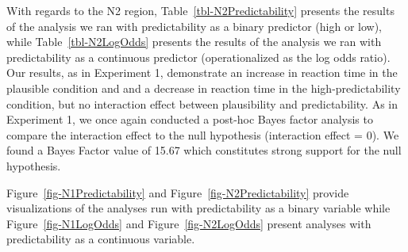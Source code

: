 \documentclass[
  12pt,
  letterpaper,
]{scrreprt}
\begin{document}
With regards to the N2 region, Table~\ref{tbl-N2Predictability} presents
the results of the analysis we ran with predictability as a binary
predictor (high or low), while Table~\ref{tbl-N2LogOdds} presents the
results of the analysis we ran with predictability as a continuous
predictor (operationalized as the log odds ratio). Our results, as in
Experiment 1, demonstrate an increase in reaction time in the plausible
condition and and a decrease in reaction time in the high-predictability
condition, but no interaction effect between plausibility and
predictability. As in Experiment 1, we once again conducted a post-hoc
Bayes factor analysis to compare the interaction effect to the null
hypothesis (interaction effect = 0). We found a Bayes Factor value of
15.67 which constitutes strong support for the null hypothesis.

Figure~\ref{fig-N1Predictability} and Figure~\ref{fig-N2Predictability}
provide visualizations of the analyses run with predictability as a
binary variable while Figure~\ref{fig-N1LogOdds} and
Figure~\ref{fig-N2LogOdds} present analyses with predictability as a
continuous variable.
\end{document}
